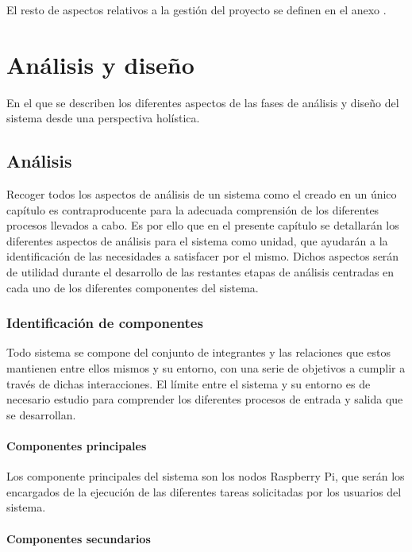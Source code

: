 El resto de aspectos relativos a la gestión del proyecto se definen en el anexo \citationneeded[TODO].

\chapter{Análisis y diseño}
\label{chapter:analisis}

\begin{cabstract}
En el que se describen los diferentes aspectos de las fases de análisis y diseño del sistema desde una perspectiva holística.
\end{cabstract}

\section{Análisis}

Recoger todos los aspectos de análisis de un sistema como el creado en un único capítulo es contraproducente para la adecuada comprensión de los diferentes procesos llevados a cabo. Es por ello que en el presente capítulo se detallarán los diferentes aspectos de análisis para el sistema como unidad, que ayudarán a la identificación de las necesidades a satisfacer por el mismo. Dichos aspectos serán de utilidad durante el desarrollo de las restantes etapas de análisis centradas en cada uno de los diferentes componentes del sistema.

\subsection{Identificación de componentes}

Todo sistema se compone del conjunto de integrantes y las relaciones que estos mantienen entre ellos mismos y su entorno, con una serie de objetivos a cumplir a través de dichas interacciones. El límite entre el sistema y su entorno es de necesario estudio para comprender los diferentes procesos de  entrada y salida que se desarrollan.

\subsubsection{Componentes principales} 

Los componente principales del sistema son los nodos Raspberry Pi, que serán los encargados de la ejecución de las diferentes tareas solicitadas por los usuarios del sistema.

\subsubsection{Componentes secundarios}

